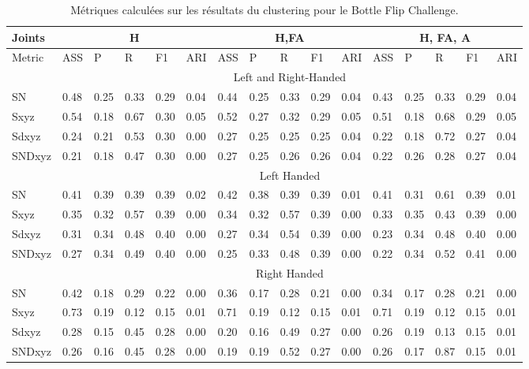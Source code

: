 \begin{landscape}

\begin{table}[]
\centering
\begin{tabular}{|l|l|l|l|l|l|l|l|l|l|l|l|l|l|l|l|}
\hline
Joints & \multicolumn{5}{c|}{H}           & \multicolumn{5}{c|}{H,FA}        & \multicolumn{5}{c|}{H, FA, A}    \\ \hline
Metric & ASS  & P    & R    & F1   & ARI  & ASS  & P    & R    & F1   & ARI  & ASS  & P    & R    & F1   & ARI  \\ \hline
& \multicolumn{15}{|c|}{Left and Right-Handed}                                                                    \\ \hline
SN     & 0.48 & 0.25 & 0.33 & 0.29 & 0.04 & 0.44 & 0.25 & 0.33 & 0.29 & 0.04 & 0.43 & 0.25 & 0.33 & 0.29 & 0.04 \\ \hline
Sxyz   & \cellcolor{green!25} 0.54 & 0.18 & 0.67 & 0.30 & 0.05 & 0.52 & 0.27 & 0.32 & 0.29 & 0.05 & 0.51 & 0.18 & 0.68 & 0.29 & 0.05 \\ \hline
Sdxyz  & 0.24 & 0.21 & 0.53 & 0.30 & 0.00 & 0.27 & 0.25 & 0.25 & 0.25 & 0.04 & 0.22 & 0.18 & 0.72 & 0.27 & 0.04 \\ \hline
SNDxyz & 0.21 & 0.18 & 0.47 & 0.30 & 0.00 & 0.27 & 0.25 & 0.26 & 0.26 & 0.04 & 0.22 & 0.26 & 0.28 & 0.27 & 0.04 \\ \hline
& \multicolumn{15}{|c|}{Left Handed}                                                                              \\ \hline
SN     & 0.41 & 0.39 & 0.39 & 0.39 & 0.02 & 0.42 & 0.38 & 0.39 & 0.39 & 0.01 & 0.41 & 0.31 & 0.61 & 0.39 & 0.01 \\ \hline
Sxyz   & 0.35 & 0.32 & 0.57 & 0.39 & 0.00 & 0.34 & 0.32 & 0.57 & 0.39 & 0.00 & 0.33 & 0.35 & 0.43 & 0.39 & 0.00 \\ \hline
Sdxyz  & 0.31 & 0.34 & 0.48 & 0.40 & 0.00 & 0.27 & 0.34 & 0.54 & 0.39 & 0.00 & 0.23 & 0.34 & 0.48 & 0.40 & 0.00 \\ \hline
SNDxyz & 0.27 & 0.34 & 0.49 & 0.40 & 0.00 & 0.25 & 0.33 & 0.48 & 0.39 & 0.00 & 0.22 & 0.34 & 0.52 & 0.41 & 0.00 \\ \hline
& \multicolumn{15}{|c|}{Right Handed}                                                                             \\ \hline
SN     & 0.42 & 0.18 & 0.29 & 0.22 & 0.00 & 0.36 & 0.17 & 0.28 & 0.21 & 0.00 & 0.34 & 0.17 & 0.28 & 0.21 & 0.00 \\ \hline
Sxyz   & \cellcolor{green!25} 0.73 & 0.19 & 0.12 & 0.15 & 0.01 & 0.71 & 0.19 & 0.12 & 0.15 & 0.01 & 0.71 & 0.19 & 0.12 & 0.15 & 0.01 \\ \hline
Sdxyz  & 0.28 & 0.15 & 0.45 & 0.28 & 0.00 & 0.20 & 0.16 & 0.49 & 0.27 & 0.00 & 0.26 & 0.19 & 0.13 & 0.15 & 0.01 \\ \hline
SNDxyz & 0.26 & 0.16 & 0.45 & 0.28 & 0.00 & 0.19 & 0.19 & 0.52 & 0.27 & 0.00 & 0.26 & 0.17 & 0.87 & 0.15 & 0.01 \\ \hline
\end{tabular}
\caption{Métriques calculées sur les résultats du clustering pour le Bottle Flip Challenge.}
\label{BfC_results}
\end{table}
\end{landscape}

